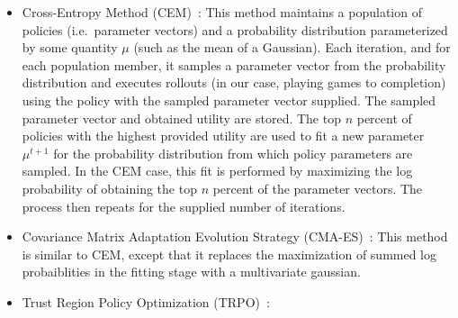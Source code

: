 \begin{itemize}
    \item Cross-Entropy Method (CEM)~\cite{rubinstein2013cross}: This method
        maintains a population of policies (i.e.\ parameter vectors) and
        a probability distribution parameterized by some quantity $\mu$ (such
        as the mean of a Gaussian). Each iteration, and for each population
        member, it samples a parameter vector from the probability distribution
        and executes rollouts (in our case, playing games to completion) using
        the policy with the sampled parameter vector supplied. The sampled
        parameter vector and obtained utility are stored. The top $n$ percent
        of policies with the highest provided utility are used to fit a new
        parameter $\mu^{t+1}$ for the probability distribution from which policy
        parameters are sampled. In the CEM case, this fit is performed by
        maximizing the log probability of obtaining the top $n$ percent of the
        parameter vectors. The process then repeats for the supplied number of
        iterations.

    \item Covariance Matrix Adaptation Evolution Strategy (CMA-ES)~\cite{cmaes}: This method is similar to CEM, except that it replaces the maximization of summed log probaiblities in the fitting stage with a multivariate gaussian.
    \item Trust Region Policy Optimization (TRPO)~\cite{TRPO}: 
\end{itemize}
